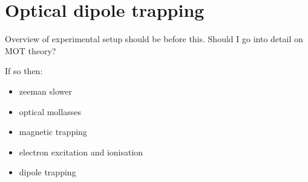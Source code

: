 \chapter{Optical dipole trapping}

Overview of experimental setup should be before this.
Should I go into detail on MOT theory?

If so then:
\begin{itemize}
\item zeeman slower
\item optical mollasses
\item magnetic trapping
\item electron excitation and ionisation
\item dipole trapping
\end{itemize}
